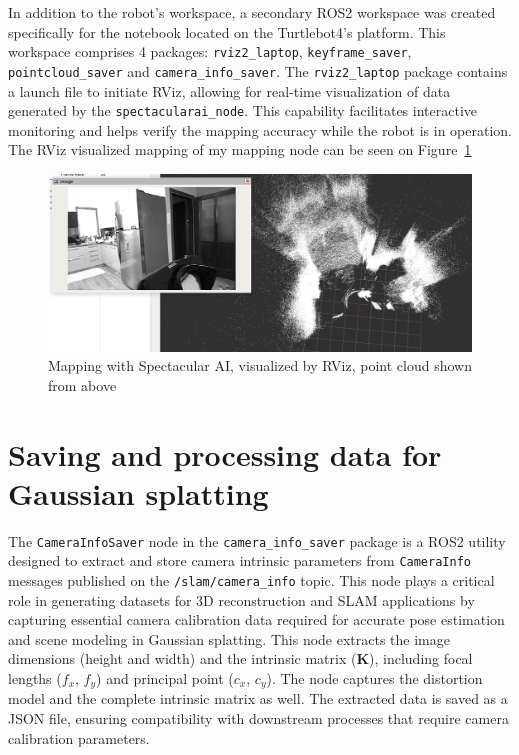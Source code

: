 In addition to the robot’s workspace, a secondary ROS2 workspace was created specifically for the notebook located on the Turtlebot4’s platform. This workspace comprises 4 packages: \verb|rviz2_laptop|, \verb|keyframe_saver|, \verb|pointcloud_saver| and \verb|camera_info_saver|. The \verb|rviz2_laptop| package contains a launch file to initiate RViz, allowing for real-time visualization of data generated by the \verb|spectacularai_node|. This capability facilitates interactive monitoring and helps verify the mapping accuracy while the robot is in operation. The RViz visualized mapping of my mapping node can be seen on Figure~\ref{fig:spai_mapping_rviz}

\begin{figure}[htbp]
	\centering
	\includegraphics[width=140mm, keepaspectratio]{figures_jpg/spai_mapping_rviz.jpg}
	\caption{Mapping with Spectacular AI, visualized by RViz, point cloud shown from above}
	\label{fig:spai_mapping_rviz}
\end{figure}

\FloatBarrier
\section{Saving and processing data for Gaussian splatting}

The \verb|CameraInfoSaver| node in the \verb|camera_info_saver| package is a ROS2 utility designed to extract and store camera intrinsic parameters from \verb|CameraInfo| messages published on the \verb|/slam/camera_info| topic. This node plays a critical role in generating datasets for 3D reconstruction and SLAM applications by capturing essential camera calibration data required for accurate pose estimation and scene modeling in Gaussian splatting. This node extracts the image dimensions (height and width) and the intrinsic matrix (\textbf{K}), including focal lengths ($f_x$, $f_y$) and principal point ($c_x$, $c_y$). The node captures the distortion model and the complete intrinsic matrix as well. The extracted data is saved as a JSON file, ensuring compatibility with downstream processes that require camera calibration parameters.

